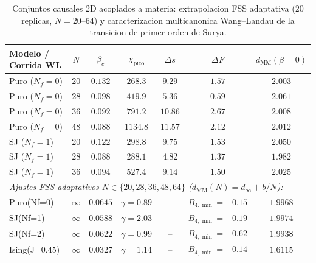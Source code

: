 \begin{table}[t]
\centering
\caption{Conjuntos causales 2D acoplados a materia: extrapolacion FSS adaptativa ($20$ replicas, $N=20\text{--}64$) y caracterizacion multicanonica Wang--Landau de la transicion de primer orden de Surya.}
\label{tab:via_b_wl_fss}
\begin{tabular}{lcccccc}
\toprule
Modelo / Corrida WL & $N$ & $\beta_c$ & $\chi_{\mathrm{pico}}$ & $\Delta s$ & $\Delta F$ & $d_{\mathrm{MM}}(\beta=0)$ \\
\midrule
Puro ($N_f=0$) & 20 & $0.132$ & $268.3$ & $9.29$ & $1.57$ & $2.003$ \\
Puro ($N_f=0$) & 28 & $0.098$ & $419.9$ & $5.36$ & $0.59$ & $2.061$ \\
Puro ($N_f=0$) & 36 & $0.092$ & $791.2$ & $10.86$ & $2.67$ & $2.008$ \\
Puro ($N_f=0$) & 48 & $0.088$ & $1134.8$ & $11.57$ & $2.12$ & $2.012$ \\
SJ ($N_f=1$) & 20 & $0.122$ & $298.8$ & $9.75$ & $1.53$ & $2.050$ \\
SJ ($N_f=1$) & 28 & $0.088$ & $288.1$ & $4.82$ & $1.37$ & $1.982$ \\
SJ ($N_f=1$) & 36 & $0.094$ & $527.4$ & $9.14$ & $1.50$ & $2.025$ \\
\midrule
\multicolumn{7}{l}{\textit{Ajustes FSS adaptativos $N \in \{20,28,36,48,64\}$ ($d_{\mathrm{MM}}(N) = d_\infty + b/N$):}} \\
Puro(Nf=0) & $\infty$ & $0.0645$ & $\gamma=0.89$ & -- & $B_{4,\min}=-0.15$ & $1.9968$ \\
SJ(Nf=1) & $\infty$ & $0.0588$ & $\gamma=2.03$ & -- & $B_{4,\min}=-0.19$ & $1.9974$ \\
SJ(Nf=2) & $\infty$ & $0.0622$ & $\gamma=0.99$ & -- & $B_{4,\min}=-0.62$ & $1.9938$ \\
Ising(J=0.45) & $\infty$ & $0.0327$ & $\gamma=1.14$ & -- & $B_{4,\min}=-0.14$ & $1.6115$ \\
\bottomrule
\end{tabular}
\end{table}

